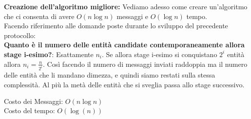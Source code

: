 \textbf{Creazione dell'algoritmo migliore:} Vediamo adesso come creare
un'algoritmo che ci consenta di avere $O(n \log n)$ messaggi e $O(\log n)$
tempo.\\
Facendo riferimento alle domande poste durante lo sviluppo del precedente
protocollo:\\

\textbf{Quanto è il numero delle entità candidate contemporaneamente allora
    stage i-esimo?}: Esattamente $n_i$. Se allora stage i-esimo si conquistano $2^i$
entità allora $n_i = \frac{n}{2^i}$. Così facendo il numero di messaggi inviati
raddoppia ma il numero delle entità che li mandano dimezza, e quindi siamo
restati sulla stessa complessità. Al più la metà delle entità che si sveglia
passa allo stage successivo.
\begin{center}
    Costo dei Messaggi: $O(n \log n)$\\
    Costo del tempo: $O(\log(n))$
\end{center}
